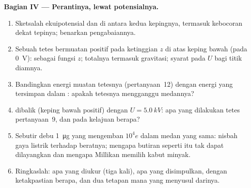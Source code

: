 \begin{problem}
\medskip
\noindent\textbf{Bagian IV --- Perantinya, lewat potensialnya.}
\begin{enumerate}[resume]
  \item Sketsalah ekuipotensial dan  di antara kedua kepingnya,
        termasuk kebocoran dekat tepinya; benarkan pengabaiannya.
  \item Sebuah tetes bermuatan positif pada ketinggian $z$ di atas keping bawah
        (pada \qty{0}{V}):  sebagai fungsi $z$;  totalnya termasuk gravitasi; syarat pada $U$ bagi titik diamnya.
  \item Bandingkan energi muatan tetesnya (pertanyaan~12) dengan
        energi yang tersimpan dalam : apakah tetesnya mengganggu medannya?
  \item {} dibalik (keping bawah positif) dengan
        $U = \qty{5.0}{kV}$: apa yang dilakukan tetes pertanyaan~9, dan pada
        kelajuan berapa?
  \item Sebutir debu \qty{1}{\micro g} yang mengemban $10^4e$ dalam medan yang
        sama: nisbah gaya listrik terhadap beratnya; mengapa butiran seperti itu
        tak dapat dilayangkan dan mengapa Millikan memilih kabut minyak.
  \item Ringkaslah: apa yang diukur (tiga kali), apa yang disimpulkan,
        dengan ketakpastian berapa, dan dua tetapan mana yang menyusul darinya.
\end{enumerate}
\end{problem}
